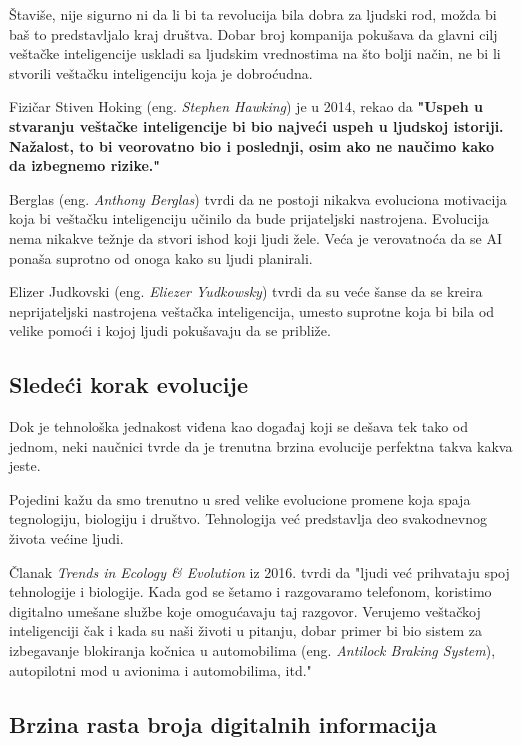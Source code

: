 \documentclass[a4paper]{article}
\begin{document}
Štaviše, nije sigurno ni da li bi ta revolucija bila dobra za ljudski rod, možda bi baš to predstavljalo kraj društva. Dobar broj kompanija pokušava da glavni cilj veštačke inteligencije uskladi sa ljudskim vrednostima na što bolji način, ne bi li stvorili veštačku inteligenciju koja je dobroćudna.

Fizičar Stiven Hoking (eng. \textit{Stephen Hawking}) je u 2014, rekao da \textbf{"Uspeh u stvaranju veštačke inteligencije bi bio najveći uspeh u ljudskoj istoriji. Nažalost, to bi veorovatno bio i poslednji, osim ako ne naučimo kako da izbegnemo rizike."}\cite{r2}

Berglas (eng. \textit{Anthony Berglas}) tvrdi da ne postoji nikakva evoluciona motivacija koja bi veštačku inteligenciju učinilo da bude prijateljski nastrojena. Evolucija nema nikakve težnje da stvori ishod koji ljudi žele. Veća je verovatnoća da se AI ponaša suprotno od onoga kako su ljudi planirali.

Elizer Judkovski (eng. \textit{Eliezer Yudkowsky}) tvrdi da su veće šanse da se kreira neprijateljski nastrojena veštačka inteligencija, umesto suprotne koja bi bila od velike pomoći i kojoj ljudi pokušavaju da se približe.

\subsection{Sledeći korak evolucije}
\label{subsec:sledeći_korak_evolucije}
\hfill

Dok je tehnološka jednakost viđena kao događaj koji se dešava tek tako od jednom, neki naučnici tvrde da je trenutna brzina evolucije perfektna takva kakva jeste.

Pojedini kažu da smo trenutno u sred velike evolucione promene koja spaja tegnologiju, biologiju i društvo. Tehnologija već predstavlja deo svakodnevnog života većine ljudi.

Članak \textit{Trends in Ecology \& Evolution}\cite{r3} iz 2016. tvrdi da "ljudi već prihvataju spoj tehnologije i biologije. Kada god se šetamo i razgovaramo telefonom, koristimo digitalno umešane službe koje omogućavaju taj razgovor. Verujemo veštačkoj inteligenciji čak i kada su naši životi u pitanju, dobar primer bi bio sistem za izbegavanje blokiranja kočnica u automobilima (eng. \textit{Antilock Braking System}), autopilotni mod u avionima i automobilima, itd."

\subsection{Brzina rasta broja digitalnih informacija}
\label{subsec:broj_digitalnih_informacija_}
\end{document}
